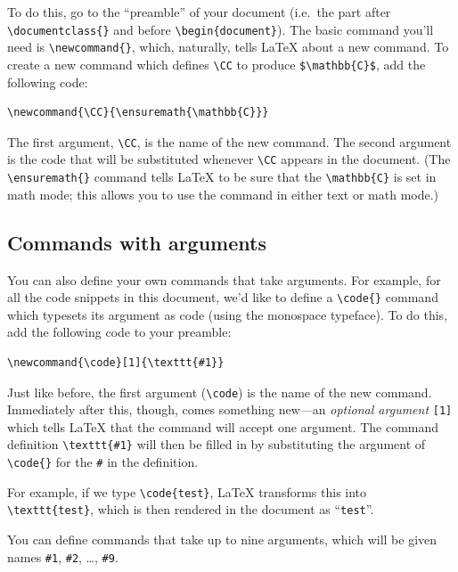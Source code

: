 \documentclass{article}
\newcommand*{\code}[1]{\texttt{#1}}
\begin{document}
To do this, go to the \enquote{preamble} of your document (i.e.~the part after \code{\textbackslash{}documentclass\{\}} and before \code{\textbackslash{}begin\{document\}}).
The basic command you'll need is \code{\textbackslash{}newcommand\{\}}, which, naturally, tells \LaTeX{} about a new command.
To create a new command which defines \code{\textbackslash{}CC} to produce \code{\$\textbackslash{}mathbb\{C\}\$}, add the following code:
\begin{verbatim}
\newcommand{\CC}{\ensuremath{\mathbb{C}}}
\end{verbatim}
The first argument, \code{\textbackslash{}CC}, is the name of the new command.
The second argument is the code that will be substituted whenever \code{\textbackslash{}CC} appears in the document.
(The \code{\textbackslash{}ensuremath\{\}} command tells \LaTeX{} to be sure that the \code{\textbackslash{}mathbb\{C\}} is set in math mode; this allows you to use the command in either text or math mode.)

\subsection{Commands with arguments}
You can also define your own commands that take arguments.
For example, for all the code snippets in this document, we'd like to define a \code{\textbackslash{}code\{\}} command which typesets its argument as code (using the monospace typeface).
To do this, add the following code to your preamble:
\begin{verbatim}
\newcommand{\code}[1]{\texttt{#1}}
\end{verbatim}
Just like before, the first argument (\code{\textbackslash{}code}) is the name of the new command.
Immediately after this, though, comes something new---an \emph{optional argument} \code{[1]} which tells \LaTeX{} that the command will accept one argument.
The command definition \code{\textbackslash{}texttt\{\#1\}} will then be filled in by substituting the argument of \code{\textbackslash{}code\{\}} for the \code{\#} in the definition.

For example, if we type \code{\textbackslash{}code\{test\}}, \LaTeX{} transforms this into \code{\textbackslash{}texttt\{test\}}, which is then rendered in the document as \enquote{\code{test}}.

You can define commands that take up to nine arguments, which will be given names \code{\#1}, \code{\#2}, \dots, \code{\#9}.
\end{document}
